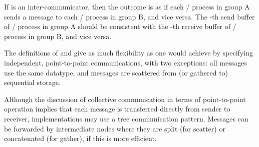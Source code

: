 If  is an inter-communicator, then the outcome is as if
each \MPI/ process in group A sends a message to each \MPI/ process in group B,
and vice versa.  The -th send buffer of \MPI/ process  in group A should
be consistent with the -th receive buffer of \MPI/ process  in group B,
and vice versa.

\begin{rationale}
The definitions of  and  give as much
flexibility as one would achieve by specifying  independent,
point-to-point communications, with two exceptions: all messages use the same
datatype, and messages are scattered from (or gathered to) sequential
storage.
\end{rationale}

\begin{implementors}
Although the discussion of collective communication in terms of
point-to-point operation implies that each message is transferred directly
from sender to receiver, implementations may use a tree communication
pattern. Messages can be forwarded by intermediate nodes where they
are split (for scatter) or concatenated (for gather), if this
is more efficient.
\end{implementors}

\label{sec:alltoallw}



